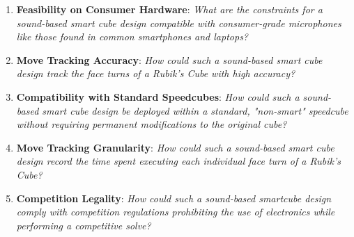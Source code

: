 \begin{enumerate}

    \item \textbf{Feasibility on Consumer Hardware}: \emph{What are the
    constraints for a sound-based smart cube design compatible with
    consumer-grade microphones like those found in common smartphones
    and laptops?}
    
    \item \textbf{Move Tracking Accuracy}: \emph{How could such a
    sound-based smart cube design track the face turns of a Rubik's
    Cube with high accuracy?}
    
    
    \item \textbf{Compatibility with Standard Speedcubes}: \emph{How
    could such a sound-based smart cube design be deployed within a
    standard, "non-smart" speedcube without requiring permanent
    modifications to the original cube?}
    
    
    \item \textbf{Move Tracking Granularity}: \emph{How could such a
    sound-based smart cube design record the time spent executing each
    individual face turn of a Rubik's Cube?}
    
    \item \textbf{Competition Legality}: \emph{How could such a
    sound-based smartcube design comply with competition regulations
    prohibiting the use of electronics while performing a competitive
    solve?}
    
\end{enumerate}
